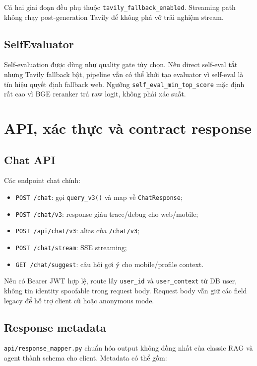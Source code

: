 \documentclass[../DoAn.tex]{subfiles}
\begin{document}
Cả hai giai đoạn đều phụ thuộc \texttt{tavily\_fallback\_enabled}. Streaming path
không chạy post-generation Tavily để không phá vỡ trải nghiệm stream.

\subsection{SelfEvaluator}

Self-evaluation được dùng như quality gate tùy chọn. Nếu direct self-eval tắt
nhưng Tavily fallback bật, pipeline vẫn có thể khởi tạo evaluator vì self-eval
là tín hiệu quyết định fallback web. Ngưỡng
\texttt{self\_eval\_min\_top\_score} mặc định rất cao vì BGE reranker trả raw
logit, không phải xác suất.

\section{API, xác thực và contract response}

\subsection{Chat API}

Các endpoint chat chính:

\begin{itemize}
    \item \texttt{POST /chat}: gọi \texttt{query\_v3()} và map về
    \texttt{ChatResponse};
    \item \texttt{POST /chat/v3}: response giàu trace/debug cho web/mobile;
    \item \texttt{POST /api/chat/v3}: alias của \texttt{/chat/v3};
    \item \texttt{POST /chat/stream}: SSE streaming;
    \item \texttt{GET /chat/suggest}: câu hỏi gợi ý cho mobile/profile context.
\end{itemize}

Nếu có Bearer JWT hợp lệ, route lấy \texttt{user\_id} và
\texttt{user\_context} từ DB user, không tin identity spoofable trong request
body. Request body vẫn giữ các field legacy để hỗ trợ client cũ hoặc anonymous
mode.

\subsection{Response metadata}

\texttt{api/response\_mapper.py} chuẩn hóa output không đồng nhất của classic
RAG và agent thành schema cho client. Metadata có thể gồm:
\end{document}
